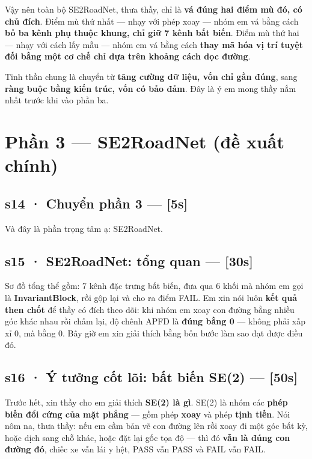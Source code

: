 \documentclass[
  11pt,
]{article}
\begin{document}
Vậy nên toàn bộ SE2RoadNet, thưa thầy, chỉ là \textbf{vá đúng hai điểm
mù đó, có chủ đích}. Điểm mù thứ nhất --- nhạy với phép xoay --- nhóm em
vá bằng cách \textbf{bỏ ba kênh phụ thuộc khung, chỉ giữ 7 kênh bất
biến}. Điểm mù thứ hai --- nhạy với cách lấy mẫu --- nhóm em vá bằng
cách \textbf{thay mã hóa vị trí tuyệt đối bằng một cơ chế chỉ dựa trên
khoảng cách dọc đường}.

Tinh thần chung là chuyển từ \textbf{tăng cường dữ liệu, vốn chỉ gần
đúng}, sang \textbf{ràng buộc bằng kiến trúc, vốn có bảo đảm}. Đây là ý
em mong thầy nắm nhất trước khi vào phần ba.

\section{Phần 3 --- SE2RoadNet (đề xuất
chính)}\label{phux1ea7n-3-se2roadnet-ux111ux1ec1-xuux1ea5t-chuxednh}

\subsection{s14 · Chuyển phần 3 ---
{[}5s{]}}\label{s14-chuyux1ec3n-phux1ea7n-3-5s}

Và đây là phần trọng tâm ạ: SE2RoadNet.

\subsection{s15 · SE2RoadNet: tổng quan ---
{[}30s{]}}\label{s15-se2roadnet-tux1ed5ng-quan-30s}

Sơ đồ tổng thể gồm: 7 kênh đặc trưng bất biến, đưa qua 6 khối mà nhóm em
gọi là \textbf{InvariantBlock}, rồi gộp lại và cho ra điểm FAIL. Em xin
nói luôn \textbf{kết quả then chốt} để thầy có đích theo dõi: khi nhóm
em xoay con đường bằng nhiều góc khác nhau rồi chấm lại, độ chênh APFD
là \textbf{đúng bằng 0} --- không phải xấp xỉ 0, mà bằng 0. Bây giờ em
xin giải thích bằng bốn bước làm sao đạt được điều đó.

\subsection{s16 · Ý tưởng cốt lõi: bất biến SE(2) ---
{[}50s{]}}\label{s16-uxfd-tux1b0ux1edfng-cux1ed1t-luxf5i-bux1ea5t-biux1ebfn-se2-50s}

Trước hết, xin thầy cho em giải thích \textbf{SE(2) là gì}. SE(2) là
nhóm các \textbf{phép biến đổi cứng của mặt phẳng} --- gồm phép
\textbf{xoay} và phép \textbf{tịnh tiến}. Nói nôm na, thưa thầy: nếu em
cầm bản vẽ con đường lên rồi xoay đi một góc bất kỳ, hoặc dịch sang chỗ
khác, hoặc đặt lại gốc tọa độ --- thì đó \textbf{vẫn là đúng con đường
đó}, chiếc xe vẫn lái y hệt, PASS vẫn PASS và FAIL vẫn FAIL.
\end{document}

